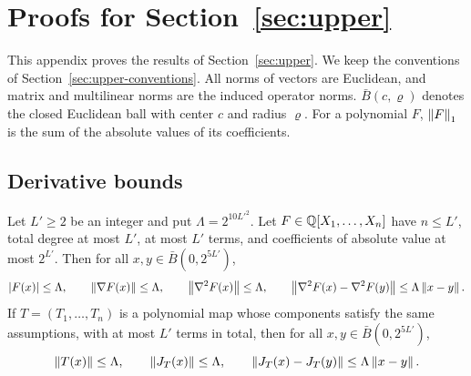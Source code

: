 \section{Proofs for Section~\ref{sec:upper}}
\label{app:upper}

This appendix proves the results of Section~\ref{sec:upper}. We keep the
conventions of Section~\ref{sec:upper-conventions}. All norms of vectors are
Euclidean, and matrix and multilinear norms are the induced operator norms.
$\bar B(c,\varrho)$ denotes the closed Euclidean ball with center $c$ and
radius $\varrho$. For a polynomial $F$, $\left\lVert F\right\rVert_1$ is the sum of the
absolute values of its coefficients.

\subsection{Derivative bounds}
\label{app:upper-bounds}

\begin{lemma}
\label{lem:upper-derivatives}
Let $L'\ge2$ be an integer and put $\Lambda=2^{10L'^2}$. Let
$F\in\mathbb Q[X_1,\ldots,X_n]$ have $n\le L'$, total degree at most $L'$, at most
$L'$ terms, and coefficients of absolute value at most $2^{L'}$. Then for all
$x,y\in\bar B(0,2^{5L'})$,
\[
 |F(x)|\le\Lambda,\qquad \left\lVert\nabla F(x)\right\rVert\le\Lambda,\qquad
 \left\lVert\nabla^2F(x)\right\rVert\le\Lambda,\qquad
 \left\lVert\nabla^2F(x)-\nabla^2F(y)\right\rVert\le\Lambda\left\lVert x-y\right\rVert.
\]
If $T=(T_1,\ldots,T_n)$ is a polynomial map whose components satisfy the same
assumptions, with at most $L'$ terms in total, then for all
$x,y\in\bar B(0,2^{5L'})$,
\[
 \left\lVert T(x)\right\rVert\le\Lambda,\qquad \left\lVert J_T(x)\right\rVert\le\Lambda,\qquad
 \left\lVert J_T(x)-J_T(y)\right\rVert\le\Lambda\left\lVert x-y\right\rVert.
\]
\end{lemma}

